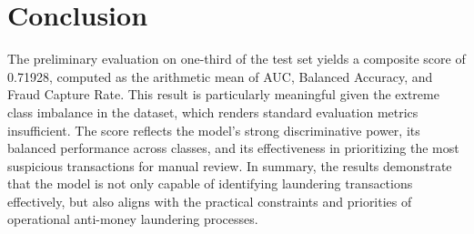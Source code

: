 \documentclass[a4paper]{article}
\begin{document}
\section{Conclusion}
\label{sec:conclusion}
The preliminary evaluation on one-third of the test set yields a composite score of 0.71928, computed as the arithmetic mean of AUC, Balanced Accuracy, and Fraud Capture Rate. This result is particularly meaningful given the extreme class imbalance in the dataset, which renders standard evaluation metrics insufficient.
The score reflects the model’s strong discriminative power, its balanced performance across classes, and its effectiveness in prioritizing the most suspicious transactions for manual review. 
In summary, the results demonstrate that the model is not only capable of identifying laundering transactions effectively, but also aligns with the practical constraints and priorities of operational anti-money laundering processes.
\end{document}
